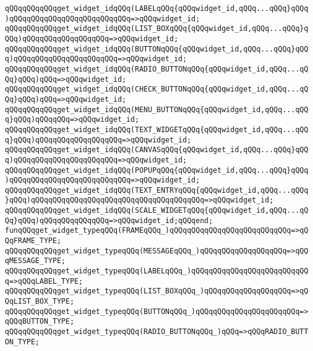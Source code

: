 \verb|qQQqqQQqqQQqget_widget_idqQQq(LABELqQQq{qQQqwidget_id,qQQq...qQQq}qQQq)qQQqqQQqqQQqqQQqqQQqqQQqqQQq=>qQQqwidget_id;|\newline
\verb|qQQqqQQqqQQqget_widget_idqQQq(LIST_BOXqQQq{qQQqwidget_id,qQQq...qQQq}qQQq)qQQqqQQqqQQqqQQqqQQq=>qQQqwidget_id;|\newline
\verb|qQQqqQQqqQQqget_widget_idqQQq(BUTTONqQQq{qQQqwidget_id,qQQq...qQQq}qQQq)qQQqqQQqqQQqqQQqqQQqqQQq=>qQQqwidget_id;|\newline
\verb|qQQqqQQqqQQqget_widget_idqQQq(RADIO_BUTTONqQQq{qQQqwidget_id,qQQq...qQQq}qQQq)qQQq=>qQQqwidget_id;|\newline
\verb|qQQqqQQqqQQqget_widget_idqQQq(CHECK_BUTTONqQQq{qQQqwidget_id,qQQq...qQQq}qQQq)qQQq=>qQQqwidget_id;|\newline
\verb|qQQqqQQqqQQqget_widget_idqQQq(MENU_BUTTONqQQq{qQQqwidget_id,qQQq...qQQq}qQQq)qQQqqQQq=>qQQqwidget_id;|\newline
\verb|qQQqqQQqqQQqget_widget_idqQQq(TEXT_WIDGETqQQq{qQQqwidget_id,qQQq...qQQq}qQQq)qQQqqQQqqQQqqQQqqQQq=>qQQqwidget_id;|\newline
\verb|qQQqqQQqqQQqget_widget_idqQQq(CANVASqQQq{qQQqwidget_id,qQQq...qQQq}qQQq)qQQqqQQqqQQqqQQqqQQqqQQq=>qQQqwidget_id;|\newline
\verb|qQQqqQQqqQQqget_widget_idqQQq(POPUPqQQq{qQQqwidget_id,qQQq...qQQq}qQQq)qQQqqQQqqQQqqQQqqQQqqQQqqQQq=>qQQqwidget_id;|\newline
\verb|qQQqqQQqqQQqget_widget_idqQQq(TEXT_ENTRYqQQq{qQQqwidget_id,qQQq...qQQq}qQQq)qQQqqQQqqQQqqQQqqQQqqQQqqQQqqQQqqQQqqQQq=>qQQqwidget_id;|\newline
\verb|qQQqqQQqqQQqget_widget_idqQQq(SCALE_WIDGETqQQq{qQQqwidget_id,qQQq...qQQq}qQQq)qQQqqQQqqQQqqQQq=>qQQqwidget_id;qQQqend;|\newline
\newline
\verb|funqQQqget_widget_typeqQQq(FRAMEqQQq_)qQQqqQQqqQQqqQQqqQQqqQQqqQQq=>qQQqFRAME_TYPE;|\newline
\verb|qQQqqQQqqQQqget_widget_typeqQQq(MESSAGEqQQq_)qQQqqQQqqQQqqQQqqQQq=>qQQqMESSAGE_TYPE;|\newline
\verb|qQQqqQQqqQQqget_widget_typeqQQq(LABELqQQq_)qQQqqQQqqQQqqQQqqQQqqQQqqQQq=>qQQqLABEL_TYPE;|\newline
\verb|qQQqqQQqqQQqget_widget_typeqQQq(LIST_BOXqQQq_)qQQqqQQqqQQqqQQqqQQq=>qQQqLIST_BOX_TYPE;|\newline
\verb|qQQqqQQqqQQqget_widget_typeqQQq(BUTTONqQQq_)qQQqqQQqqQQqqQQqqQQqqQQq=>qQQqBUTTON_TYPE;|\newline
\verb|qQQqqQQqqQQqget_widget_typeqQQq(RADIO_BUTTONqQQq_)qQQq=>qQQqRADIO_BUTTON_TYPE;|\newline
